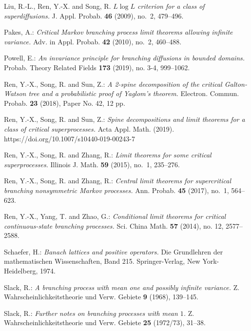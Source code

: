\documentclass[12pt,a4paper]{amsart}
\theoremstyle{definition}
\numberwithin{equation}{section}
\begin{document}
\begin{thebibliography}{10}
	
  Liu, R.-L., Ren, Y.-X. and Song, R.
	\emph{{$L\log L$} criterion for a class of superdiffusions.}
	J. Appl. Probab. \textbf{46} (2009), no.~2, 479--496.

	
	Pakes, A.:
	\emph{Critical {M}arkov branching process limit theorems allowing infinite variance.}
	Adv. in Appl. Probab. \textbf{42} (2010), no.~2, 460--488.
	
	
  Powell, E.:
  \emph{An invariance principle for branching diffusions in bounded domains.}
  Probab. Theory Related Fields  \textbf{173} (2019), no. 3-4, 999–1062.

  Ren, Y.-X., Song, R. and Sun, Z.:
  \emph{A 2-spine decomposition of the critical Galton-Watson tree and a probabilistic proof of Yaglom's theorem.}
  Electron. Commun. Probab. \textbf{23} (2018), Paper No. 42, 12 pp.
	
  Ren, Y.-X., Song, R. and Sun, Z.:
  \emph{Spine decompositions and limit theorems for a class of critical superprocesses.}
  Acta Appl. Math. (2019). https://doi.org/10.1007/s10440-019-00243-7

	Ren, Y.-X., Song, R. and Zhang, R.:
  \emph{Limit theorems for some critical superprocesses.}
	Illinois J. Math. \textbf{59} (2015), no.~1, 235--276.
	
	Ren, Y.-X., Song, R. and Zhang, R.:
	\emph{Central limit theorems for supercritical branching nonsymmetric {M}arkov processes.}
	Ann. Probab. \textbf{45} (2017), no.~1, 564--623.
	
	Ren, Y.-X., Yang, T. and Zhao, G.:
	\emph{Conditional limit theorems for critical continuous-state branching processes.}
	Sci. China Math. \textbf{57} (2014), no. 12, 2577–2588.
	
	Schaefer, H.:
	\emph{Banach lattices and positive operators.}
	Die Grundlehren der mathematischen Wissenschaften, Band 215. Springer-Verlag, New York-Heidelberg, 1974.
	
	Slack, R.:
	\emph{A branching process with mean one and possibly infinite variance.}
	Z. Wahrscheinlichkeitstheorie und Verw. Gebiete \textbf{9} (1968), 139--145.
	
	Slack, R.:
  \emph{Further notes on branching processes with mean {$1$}.}
	Z. Wahrscheinlichkeitstheorie und Verw. Gebiete \textbf{25} (1972/73), 31–38.
	

\end{thebibliography}
\end{document}
